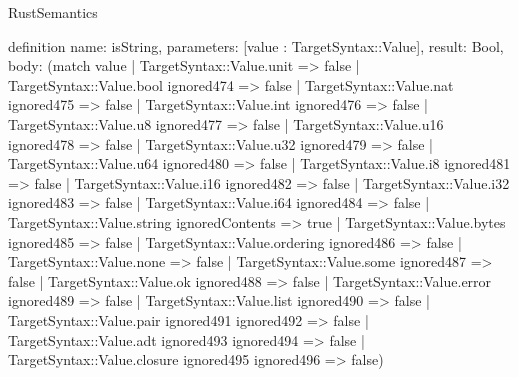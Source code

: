 \begin{lexlean}{RustSemantics}
\begin{semanticmodule}
definition{
  name: isString,
  parameters: [value : TargetSyntax::Value],
  result: Bool,
  body: (match value
    | TargetSyntax::Value.unit => false
    | TargetSyntax::Value.bool ignored474 => false
    | TargetSyntax::Value.nat ignored475 => false
    | TargetSyntax::Value.int ignored476 => false
    | TargetSyntax::Value.u8 ignored477 => false
    | TargetSyntax::Value.u16 ignored478 => false
    | TargetSyntax::Value.u32 ignored479 => false
    | TargetSyntax::Value.u64 ignored480 => false
    | TargetSyntax::Value.i8 ignored481 => false
    | TargetSyntax::Value.i16 ignored482 => false
    | TargetSyntax::Value.i32 ignored483 => false
    | TargetSyntax::Value.i64 ignored484 => false
    | TargetSyntax::Value.string ignoredContents => true
    | TargetSyntax::Value.bytes ignored485 => false
    | TargetSyntax::Value.ordering ignored486 => false
    | TargetSyntax::Value.none => false
    | TargetSyntax::Value.some ignored487 => false
    | TargetSyntax::Value.ok ignored488 => false
    | TargetSyntax::Value.error ignored489 => false
    | TargetSyntax::Value.list ignored490 => false
    | TargetSyntax::Value.pair ignored491 ignored492 => false
    | TargetSyntax::Value.adt ignored493 ignored494 => false
    | TargetSyntax::Value.closure ignored495 ignored496 => false)
}


\end{semanticmodule}
\end{lexlean}

